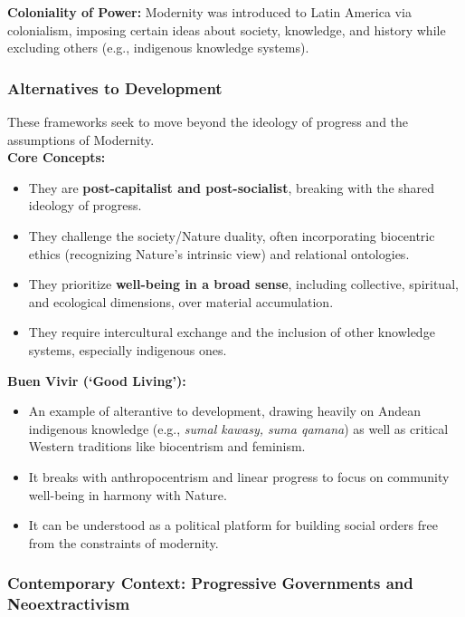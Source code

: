 \documentclass{article}
\begin{document}
    \noindent \textbf{Coloniality of Power:} Modernity was introduced to
Latin America via colonialism, imposing certain ideas about society,
knowledge, and history while excluding others (e.g., indigenous knowledge
systems).

    \subsubsection{Alternatives to Development}

    \noindent These frameworks seek to move beyond the ideology of progress
and the assumptions of Modernity.\\

    \noindent \textbf{Core Concepts:}
    \begin{itemize}
        \item They are \textbf{post-capitalist and post-socialist}, breaking
        with the shared ideology of progress.
        \item They challenge the society/Nature duality, often incorporating
        biocentric ethics (recognizing Nature's intrinsic view) and
        relational ontologies.
        \item They prioritize \textbf{well-being in a broad sense},
        including collective, spiritual, and ecological dimensions, over
        material accumulation.
        \item They require intercultural exchange and the inclusion of other
        knowledge systems, especially indigenous ones.
    \end{itemize}

    \noindent \textbf{Buen Vivir (`Good Living'):}
    \begin{itemize}
        \item An example of alterantive to development, drawing heavily on
        Andean indigenous knowledge (e.g., \textit{sumal kawasy, suma qamana}) as well as critical Western traditions like biocentrism and feminism.
        \item It breaks with anthropocentrism and linear progress to focus
        on community well-being in harmony with Nature.
        \item It can be understood as a political platform for building
        social orders free from the constraints of modernity.
    \end{itemize}

    \subsubsection{Contemporary Context: Progressive Governments and Neoextractivism}
\end{document}
